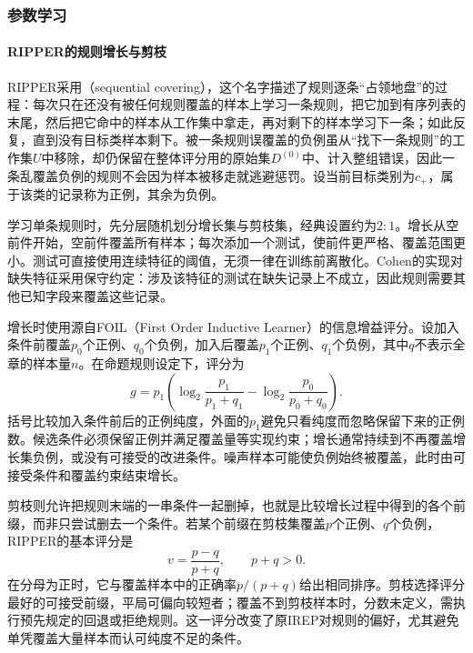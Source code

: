 \subsubsection{参数学习}
\label{sec:classification-ripper-learning}

\paragraph{RIPPER的规则增长与剪枝}
RIPPER采用（sequential covering），这个名字描述了规则逐条“占领地盘”的过程：每次只在还没有被任何规则覆盖的样本上学习一条规则，把它加到有序列表的末尾，然后把它命中的样本从工作集中拿走，再对剩下的样本学习下一条；如此反复，直到没有目标类样本剩下。被一条规则误覆盖的负例虽从“找下一条规则”的工作集$U$中移除，却仍保留在整体评分用的原始集$D^{(0)}$中、计入整组错误，因此一条乱覆盖负例的规则不会因为样本被移走就逃避惩罚。设当前目标类别为$c_+$，属于该类的记录称为正例，其余为负例。

学习单条规则时，先分层随机划分增长集与剪枝集，经典设置约为$2:1$。增长从空前件开始，空前件覆盖所有样本；每次添加一个测试，使前件更严格、覆盖范围更小。测试可直接使用连续特征的阈值，无须一律在训练前离散化。Cohen的实现对缺失特征采用保守约定：涉及该特征的测试在缺失记录上不成立，因此规则需要其他已知字段来覆盖这些记录。

增长时使用源自FOIL（First Order Inductive Learner）的信息增益评分。设加入条件前覆盖$p_0$个正例、$q_0$个负例，加入后覆盖$p_1$个正例、$q_1$个负例，其中$q$不表示全章的样本量$n$。在命题规则设定下，评分为
\begin{equation}
  g=p_1\left(
  \log_2\frac{p_1}{p_1+q_1}
  -\log_2\frac{p_0}{p_0+q_0}
  \right).
  \label{eq:classification-foil-gain}
\end{equation}
括号比较加入条件前后的正例纯度，外面的$p_1$避免只看纯度而忽略保留下来的正例数。候选条件必须保留正例并满足覆盖量等实现约束；增长通常持续到不再覆盖增长集负例，或没有可接受的改进条件。噪声样本可能使负例始终被覆盖，此时由可接受条件和覆盖约束结束增长。

剪枝则允许把规则末端的一串条件一起删掉，也就是比较增长过程中得到的各个前缀，而非只尝试删去一个条件。若某个前缀在剪枝集覆盖$p$个正例、$q$个负例，RIPPER的基本评分是
\begin{equation}
  v=\frac{p-q}{p+q},\qquad p+q>0.
  \label{eq:classification-ripper-pruning}
\end{equation}
在分母为正时，它与覆盖样本中的正确率$p/(p+q)$给出相同排序。剪枝选择评分最好的可接受前缀，平局可偏向较短者；覆盖不到剪枝样本时，分数未定义，需执行预先规定的回退或拒绝规则。这一评分改变了原IREP对规则的偏好，尤其避免单凭覆盖大量样本而认可纯度不足的条件。

